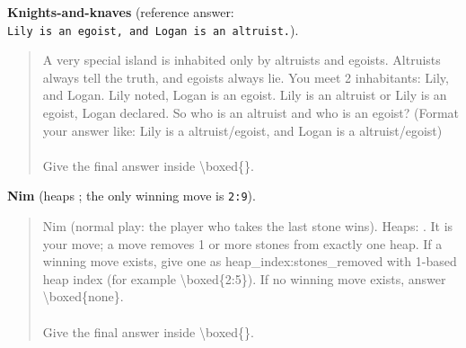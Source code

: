 \documentclass[
  10pt,
]{article}
\begin{document}
\textbf{Knights-and-knaves} (reference answer:
\texttt{Lily\ is\ an\ egoist,\ and\ Logan\ is\ an\ altruist.}).

\begin{quote}\small\ttfamily\raggedright\setlength{\parskip}{0pt}
A very special island is inhabited only by altruists and egoists. Altruists always tell the truth, and egoists always lie. You meet 2 inhabitants: Lily, and Logan. Lily noted, \textquotedbl{}Logan is an egoist\textquotedbl{}. \textquotedbl{}Lily is an altruist or Lily is an egoist,\textquotedbl{} Logan declared. So who is an altruist and who is an egoist? (Format your answer like: \textquotedbl{}Lily is a altruist/egoist, and Logan is a altruist/egoist\textquotedbl{}) \\
~ \\
Give the final answer inside \textbackslash{}boxed\{\}.
\end{quote}

\textbf{Nim} (heaps \cite{r5,r13,r2,r3}; the only winning move is \texttt{2:9}).

\begin{quote}\small\ttfamily\raggedright\setlength{\parskip}{0pt}
Nim (normal play: the player who takes the last stone wins). Heaps: \cite{r5,r13,r2,r3}. It is your move; a move removes 1 or more stones from exactly one heap. If a winning move exists, give one as heap\_index:stones\_removed with 1-based heap index (for example \textbackslash{}boxed\{2:5\}). If no winning move exists, answer \textbackslash{}boxed\{none\}. \\
~ \\
Give the final answer inside \textbackslash{}boxed\{\}.
\end{quote}
\end{document}
